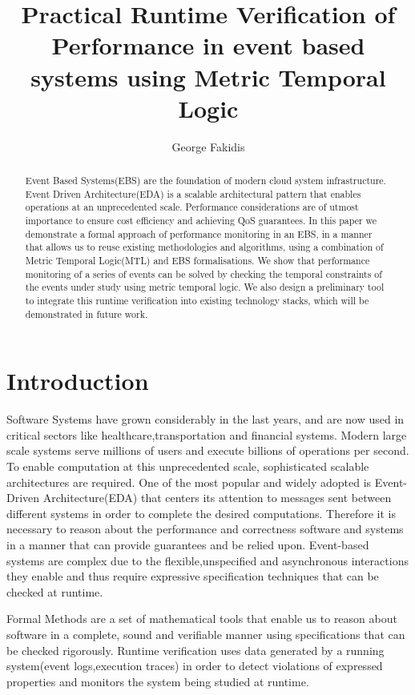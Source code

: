 \documentclass[twocolumn]{article}
\title{Practical Runtime Verification of Performance in event based systems using Metric Temporal Logic}
\author[1]{George Fakidis}
\affil[1]{Athens University of Economics and Business}
\begin{document}
\maketitle
\begin{abstract}
	Event Based Systems(EBS) are the foundation of modern cloud system infrastructure. Event Driven Architecture(EDA) is a scalable architectural pattern that enables operations at an unprecedented scale. Performance considerations are of utmost importance to ensure cost efficiency and achieving QoS guarantees.
	In this paper we demonstrate a formal approach of performance monitoring in an EBS, in a manner that allows us to reuse existing methodologies and algorithms, using a combination of Metric Temporal Logic(MTL) and EBS formalisations.
	We show that performance monitoring of a series of events can be solved by checking the temporal constraints of the events under study using metric temporal logic.
	We also design a preliminary tool to integrate this runtime verification into existing technology stacks, which will be demonstrated in future work.
\end{abstract}


\section{Introduction}

Software Systems have grown considerably in the last years, and are now used in critical sectors like healthcare,transportation and financial systems.
Modern large scale systems serve millions of users and execute billions of operations per second.
To enable computation at this unprecedented scale, sophisticated scalable architectures are required.
One of the most popular and widely adopted is Event-Driven Architecture(EDA) that centers its attention to messages sent between different systems in order to complete the desired computations.
Therefore it is necessary to reason about the performance and correctness software and systems in a manner that can provide guarantees and be relied upon. Event-based systems are complex due to the flexible,unspecified and asynchronous interactions they enable and thus require expressive specification techniques that can be checked at runtime.
\par
Formal Methods are a set of mathematical tools that enable us to reason about software in a complete, sound and verifiable manner using specifications that can be checked rigorously. Runtime verification uses data generated by a running system(event logs,execution traces) in order to detect violations of expressed properties and monitors the system being studied at runtime.
\end{document}
